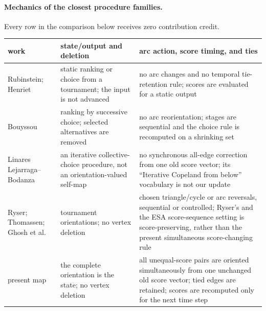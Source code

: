 \documentclass[11pt,a4paper]{amsart}
\theoremstyle{definition}
\theoremstyle{remark}
\begin{document}
\paragraph{Mechanics of the closest procedure families.}
Every row in the comparison below receives zero contribution credit.
\begin{center}
\scriptsize
\begin{tabular}{@{}
  >{\raggedright\arraybackslash}p{.22\linewidth}
  >{\raggedright\arraybackslash}p{.33\linewidth}
  >{\raggedright\arraybackslash}p{.37\linewidth}@{}}
\toprule
work & state/output and deletion & arc action, score timing, and ties\\
\midrule
Rubinstein; Henriet
 & static ranking or choice from a tournament; the input is not advanced
 & no arc changes and no temporal tie-retention rule; scores are evaluated
   for a static output \cite{Rubinstein1980,Henriet1985}\\
Bouyssou
 & ranking by successive choice; selected alternatives are removed
 & no arc reorientation; stages are sequential and the choice rule is
   recomputed on a shrinking set \cite{Bouyssou2004}\\
Linares Lejarraga--Bodanza
 & an iterative collective-choice procedure, not an orientation-valued
   self-map
 & no synchronous all-edge correction from one old score vector; its
   ``Iterative Copeland from below'' vocabulary is not our update
   \cite{LinaresBodanza2025}\\
Ryser; Thomassen; Ghosh et al.
 & tournament orientations; no vertex deletion
 & chosen triangle/cycle or arc reversals, sequential or controlled;
   Ryser's and the ESA score-sequence setting is score-preserving, rather
   than the present simultaneous score-changing rule
   \cite{Ryser1964,Thomassen1988,GhoshEtAl2026}\\
present map
 & the complete orientation is the state; no vertex deletion
 & all unequal-score pairs are oriented simultaneously from one unchanged
   old score vector; tied edges are retained; scores are recomputed only for
   the next time step\\
\bottomrule
\end{tabular}
\end{center}
\end{document}
